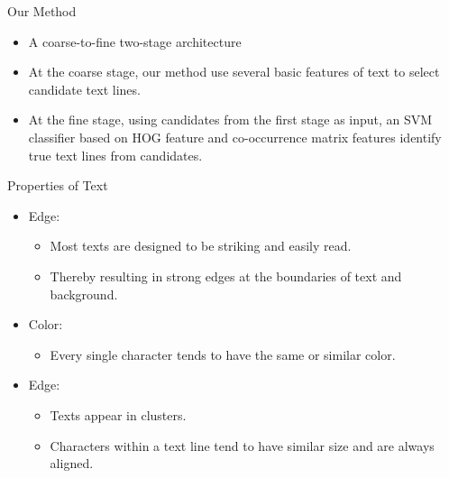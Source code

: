 \documentclass[a0paper,portrait]{baposter}
\begin{document}
\begin{poster}
\begin{posterbox}[name=method,column=0,below=overview]{Our Method}
\begin{itemize}
  \item A coarse-to-fine two-stage architecture
  \item At the coarse stage, our method use several basic features of text to select candidate text lines.
  \item At the fine stage, using candidates from the first stage as input, an SVM classifier based on HOG feature and co-occurrence matrix features identify true text lines from candidates.
\end{itemize}
\end{posterbox}










\begin{posterbox}[name=text,column=0,below=method]{Properties of Text}

\begin{itemize}
  \item Edge:
    \begin{itemize}
      \item Most texts are designed to be striking and easily read.
      \item Thereby resulting in strong edges at the boundaries of text and background.
    \end{itemize}
  \item Color:
    \begin{itemize}
        \item Every single character tends to have the same or similar color.
    \end{itemize}
  \item Edge:
    \begin{itemize}
        \item Texts appear in clusters.
        \item Characters within a text line tend to have similar size and are always aligned.
    \end{itemize}
\end{itemize}

\end{posterbox}












\end{poster}
\end{document}
